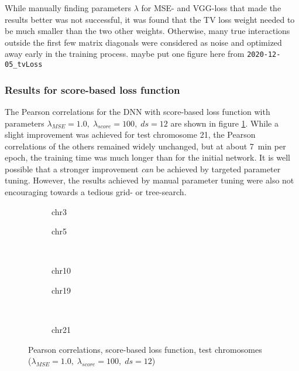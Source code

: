While manually finding parameters $\lambda$ for MSE- and VGG-loss that made the results better was not successful,
it was found that the TV loss weight needed to be much smaller than the two other weights.
Otherwise, many true interactions outside the first few matrix diagonals were considered as noise and optimized away early in the training process.
\xxx maybe put one figure here from \texttt{2020-12-05\_tvLoss}

\subsubsection{Results for score-based loss function} \label{sec:results:scorebased}
The Pearson correlations for the DNN with score-based loss function with parameters $\lambda_\mathit{MSE}=1.0,\; \lambda_\mathit{score}=100,\; ds=12$ 
are shown in figure \ref{fig:results:scoreLossDNN_pearson}.
While a slight improvement was achieved for test chromosome 21, the Pearson correlations of the others remained widely unchanged,
but at about \SI{7}{min} per epoch, the training time was much longer than for the initial network.
It is well possible that a stronger improvement \emph{can} be achieved by targeted parameter tuning. 
However, the results achieved by manual parameter tuning were also not encouraging towards a tedious grid- or tree-search.
\begin{figure}[p]
    \begin{subfigure}{0.45\textwidth}
        \scriptsize
        \caption{chr3}
    \end{subfigure} \hfill
    \begin{subfigure}{0.45\textwidth}
        \scriptsize
        \caption{chr5}
    \end{subfigure}\\[5mm]
    \begin{subfigure}{0.45\textwidth}
        \scriptsize
        \caption{chr10}
    \end{subfigure}\hfill
    \begin{subfigure}{0.45\textwidth}
        \scriptsize
        \caption{chr19}
    \end{subfigure}\\[3mm]
    \centering
    \begin{subfigure}{0.45\textwidth}
        \scriptsize
        \caption{chr21}
    \end{subfigure}
    \caption{Pearson correlations, score-based loss function, test chromosomes\\ ($\lambda_\mathit{MSE}=1.0,\; \lambda_\mathit{score}=100,\; ds=12$)}
    \label{fig:results:scoreLossDNN_pearson}
\end{figure}
